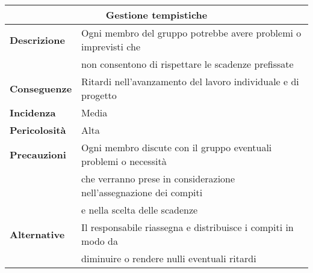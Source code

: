 \begin{center}
    \begin{tabularx}{0.8\linewidth}{l|l}
        \multicolumn{2}{c}{\textbf{Gestione tempistiche}}                                                      \\
        \hline{\textbf{Descrizione}}    & Ogni membro del gruppo potrebbe avere problemi o imprevisti che      \\
                                        & non consentono di rispettare le scadenze prefissate                  \\                                 
        \textbf{Conseguenze}            & Ritardi nell'avanzamento del lavoro individuale e di progetto        \\
        \textbf{Incidenza}              & Media                                                                \\
        \textbf{Pericolosità}           & Alta                                                                 \\
        \textbf{Precauzioni}            & Ogni membro discute con il gruppo eventuali problemi o necessità     \\
                                        & che verranno prese in considerazione nell'assegnazione dei compiti   \\
                                        & e nella scelta delle scadenze                                        \\
        \textbf{Alternative}            & Il responsabile riassegna e distribuisce i compiti in modo da         \\ 
                                        & diminuire o rendere nulli eventuali ritardi                          \\ 
    \end{tabularx}
\end{center}


